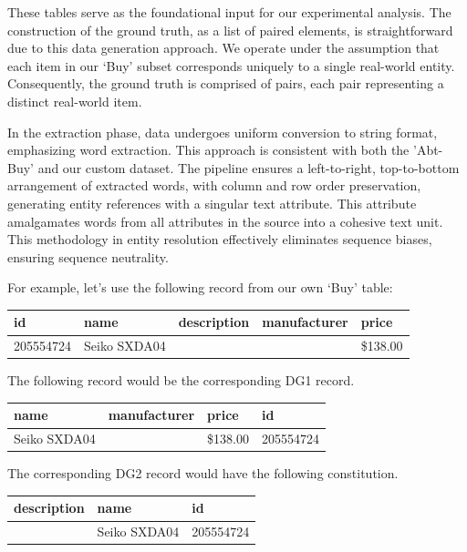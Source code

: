 \documentclass[lettersize,journal]{IEEEtran}
\begin{document}
    These tables serve as the foundational input for our experimental analysis.
    The construction of the ground truth, as a list of paired elements, is
    straightforward due to this data generation approach.
    We operate under the assumption that each item in our `Buy' subset
    corresponds uniquely to a single real-world entity.
    Consequently, the ground truth is comprised of pairs, each pair representing
    a distinct real-world item.

    In the extraction phase, data undergoes uniform conversion to string format,
    emphasizing word extraction.
    This approach is consistent with both the 'Abt-Buy' and our custom dataset.
    The pipeline ensures a left-to-right, top-to-bottom arrangement of extracted
    words, with column and row order preservation, generating entity references
    with a singular text attribute.
    This attribute amalgamates words from all attributes in the source into a
    cohesive text unit. This methodology in entity resolution effectively
    eliminates sequence biases, ensuring sequence neutrality.

    For example, let's use the following record from our own `Buy' table:

    \begin{center}
        \begin{tabular}[b]{|l|l|l|l|l|}
            \hline
            id&name&description&manufacturer&price\\
            \hline
            205554724&Seiko SXDA04& & &\$138.00\\
            \hline
        \end{tabular}
    \end{center}

    The following record would be the corresponding DG1 record.
    
    \begin{center}
        \begin{tabular}[b]{|l|l|l|l|}
            \hline
            name&manufacturer&price&id \\
            \hline
            Seiko SXDA04& &\$138.00&205554724 \\
            \hline
        \end{tabular}
    \end{center}

    The corresponding DG2 record would have the following constitution.

    \begin{center}
        \begin{tabular}[b]{|l|l|l|}
            \hline
            description&name&id \\
            \hline
            &Seiko SXDA04&205554724 \\
            \hline
        \end{tabular}
    \end{center}
\end{document}
